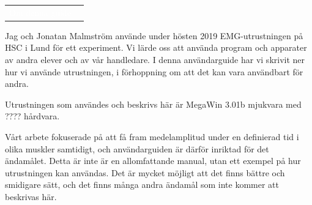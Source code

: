 \documentclass[10pt,a4paper]{article}
\newcommand{\pagetitle}[2] {
	\begin{tabularx}{\linewidth}{>{\columncolor{darkpurple}}c >{\columncolor{lightpurple!35}}X}
		\LARGE \textcolor{white}{{#1}} & \LARGE {#2} \\[3pt]
	\end{tabularx}
}
\begin{document}
\restoregeometry
\newpage


\pagetitle{Om denna guide}{}\par
\vspace{1em}
Jag och Jonatan Malmström använde under hösten 2019 EMG-utrustningen på HSC i Lund för ett experiment. Vi lärde oss att använda program och apparater av andra elever och av vår handledare. I denna användarguide har vi skrivit ner hur vi använde utrustningen, i förhoppning om att det kan vara användbart för andra.

Utrustningen som användes och beskrivs här är MegaWin 3.01b mjukvara med ???? hårdvara.  

Vårt arbete fokuserade på att få fram medelamplitud under en definierad tid i olika muskler samtidigt, och användarguiden är därför inriktad för det ändamålet. Detta är inte är en allomfattande manual, utan ett exempel på hur utrustningen kan användas. Det är mycket möjligt att det finns bättre och smidigare sätt, och det finns många andra ändamål som inte kommer att beskrivas här.
\end{document}
